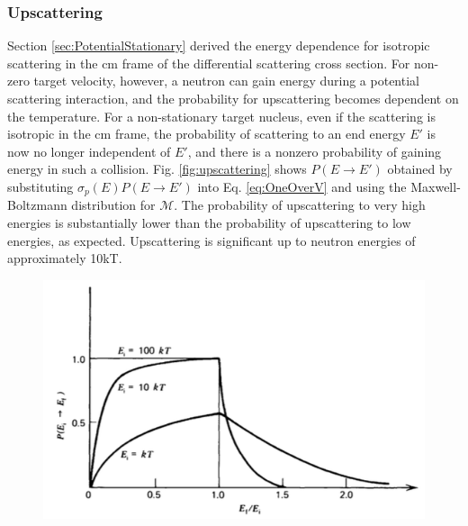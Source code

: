 \subsubsection{Upscattering}

Section \ref{sec:PotentialStationary} derived the energy dependence for isotropic scattering in the \gls{cm} frame of the differential scattering cross section. For non-zero target velocity, however, a neutron can gain energy during a potential scattering interaction, and the probability for upscattering becomes dependent on the temperature. For a non-stationary target nucleus, even if the scattering is isotropic in the \gls{cm} frame, the probability of scattering to an end energy \(E'\) is now no longer independent of \(E'\), and there is a nonzero probability of gaining energy in such a collision. Fig. \ref{fig:upscattering} shows \(P(E\rightarrow E')\) obtained by substituting \(\sigma_p(E)P(E\rightarrow E')\) into Eq. \eqref{eq:OneOverV} and using the Maxwell-Boltzmann distribution for \(\mathscr{M}\). The probability of upscattering to very high energies is substantially lower than the probability of upscattering to low energies, as expected. Upscattering is significant up to neutron energies of approximately 10kT. 

\begin{figure}[H]
\centering
\includegraphics[width=0.5\linewidth]{figures/upscattering.png}
\end{figure}
